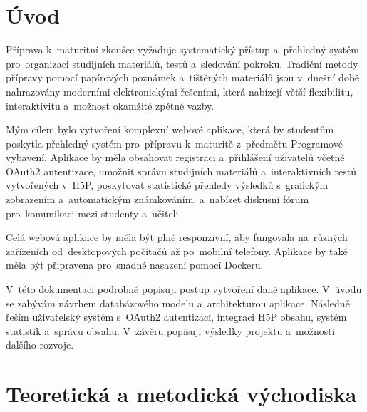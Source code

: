 \documentclass[12pt, a4paper,
twoside,
openany
]{report}
\renewcommand{\cftchapfont}{\normalsize\bfseries}
\renewcommand{\cftsecfont}{\normalsize}
\renewcommand{\cftsubsecfont}{\small}
\renewcommand{\cftsubsubsecfont}{\small}
\renewcommand{\cftchappagefont}{\normalsize}
\renewcommand{\cftsecpagefont}{\normalsize}
\renewcommand{\cftsubsecpagefont}{\small}
\renewcommand{\cftsubsubsecpagefont}{\small}
\begin{document}
	\clearpage

	\pagestyle{fancy}
	\vspace*{-1.5cm}
	\begingroup
	\renewcommand{\baselinestretch}{1.0}\normalsize
	\renewcommand{\cftchapfont}{\large\bfseries}
	\renewcommand{\cftsecfont}{\normalsize}
	\renewcommand{\cftsubsecfont}{\normalsize}
	\renewcommand{\cftsubsubsecfont}{\normalsize}
	\renewcommand{\cftchappagefont}{\large\bfseries}
	\renewcommand{\cftsecpagefont}{\normalsize}
	\renewcommand{\cftsubsecpagefont}{\normalsize}
	\renewcommand{\cftsubsubsecpagefont}{\normalsize}
	\endgroup
	\tableofcontents
	
	\setcounter{page}{1}
	\pagestyle{fancy}

	\chapter*{Úvod}
	
	Příprava k~maturitní zkoušce vyžaduje systematický přístup a~přehledný systém pro~organizaci studijních materiálů, testů a~sledování pokroku. Tradiční metody přípravy pomocí papírových poznámek a~tištěných materiálů jsou v~dnešní době nahrazovány moderními elektronickými řešeními, která nabízejí větší flexibilitu, interaktivitu a~možnost okamžité zpětné vazby.
	
	Mým cílem bylo vytvoření komplexní webové aplikace, která by studentům poskytla přehledný systém pro~přípravu k~maturitě z~předmětu Programové vybavení. Aplikace by měla obsahovat registraci a~přihlášení uživatelů včetně OAuth2 autentizace, umožnit správu studijních materiálů a~interaktivních testů vytvořených v~H5P, poskytovat statistické přehledy výsledků s~grafickým zobrazením a~automatickým známkováním, a~nabízet diskusní fórum pro~komunikaci mezi studenty a~učiteli.
	
	Celá webová aplikace by měla být plně responzivní, aby fungovala na~různých zařízeních od~desktopových počítačů až po~mobilní telefony. Aplikace by také měla být připravena pro~snadné nasazení pomocí Dockeru.
	
	V~této dokumentaci podrobně popisuji postup vytvoření dané aplikace. V~úvodu se zabývám návrhem databázového modelu a~architekturou aplikace. Následně řeším uživatelský systém s~OAuth2 autentizací, integraci H5P obsahu, systém statistik a~správu obsahu. V~závěru popisuji výsledky projektu a~možnosti dalšího rozvoje.

	\chapter{Teoretická a metodická východiska}
\end{document}
